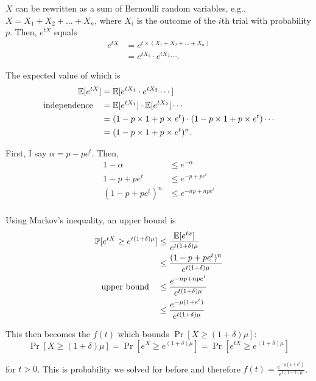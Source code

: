 \documentclass[11pt]{article}
\begin{document}
\begin{solution}
    
\begin{Parts}
    
\Part $X$ can be rewritten as a sum of Bernoulli random variables, e.g., $X = 
X_1 + X_2 + \dots + X_n$, where $X_i$ is the outcome of the $i$th trial with 
probability $p$. Then, $e^{tX}$ equals
\[
    \begin{split}
        e^{tX} &= e^{t \times (X_1 + X_2 + \dots + X_n)} \\
        &= e^{tX_1} \cdot e^{tX_2} \cdots.
    \end{split}
\]

The expected value of which is 
\[
    \begin{split}
        \operatorname{\mathbb{E}}[e^{tX}] &= \operatorname{\mathbb{E}}[e^{tX_1} \cdot e^{tX_2} \cdots ] \\
        \text{independence} \quad &= \operatorname{\mathbb{E}}[e^{tX_1}] \cdot \operatorname{\mathbb{E}}[e^{tX_2}] \cdots  \\
        &= (1-p \times 1 + p \times e^t) \cdot (1-p \times 1 + p \times e^t) \cdots \\
        &= (1-p \times 1 + p \times e^t)^n.
    \end{split}
\]

\Part First, I say $\alpha = p-pe^t$. Then,
\[
    \begin{split}
        1-\alpha &\leq e^{-\alpha} \\
        1-p+pe^t &\leq e^{-p+pe^t} \\
        (1-p+pe^t)^n &\leq e^{-np+npe^t} \\
    \end{split}
\]

\Part Using Markov's inequality, an upper bound is
\[
    \begin{split}
        \operatorname{\mathbb{P}}[e^{tX} \ge e^{t(1 + \delta) \mu}] &\leq \frac{\operatorname{\mathbb{E}}[e^{tx}]}{e^{t(1+ \delta) \mu}} \\
        &\leq \frac{(1-p+pe^t)^n}{e^{t(1+\delta) \mu}} \\
        \text{upper bound} \quad &\leq \frac{e^{-np+npe^t}}{e^{t(1+\delta) \mu}} \\
        &\leq \frac{e^{-\mu(1+e^t)}}{e^{t(1+\delta) \mu}}
    \end{split}
\]

This then becomes the $f(t)$ which bounds $\Pr[X \geq (1+\delta)\mu]$:
\[
    \Pr[X \geq (1+\delta)\mu] = \Pr[e^X \geq e^{(1+\delta)\mu}]
    = \Pr[e^{tX} \geq e^{(1+\delta)\mu}]
\]

for $t > 0$. This is probability we solved for before and therefore $f(t) = 
\frac{e^{-\mu(1+e^t)}}{e^{t(1+\delta) \mu}}$.

\end{Parts}

\end{solution}
\end{document}

